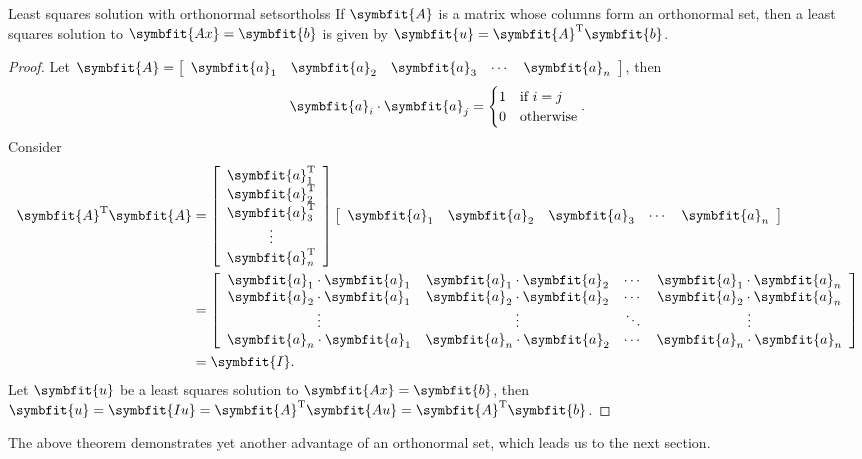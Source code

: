\documentclass[math]{amznotes}
\theoremstyle{remark}
\begin{document}
\begin{thmbox}{Least squares solution with orthonormal sets}{ortholss}
    If $\symbfit{A}$ is a matrix whose columns form an orthonormal set, then a least squares solution to $\symbfit{Ax} = \symbfit{b}$ is given by $\symbfit{u} = \symbfit{A}^{\mathrm{T}}\symbfit{b}$.
    \tcblower
    \begin{proof}
        Let $\symbfit{A} = \left[\begin{array}{ccccc}
            \symbfit{a}_1 & \symbfit{a}_2 & \symbfit{a}_3 & \cdots & \symbfit{a}_n
        \end{array}\right]$, then 
        \begin{displaymath}
            \symbfit{a}_i \cdot \symbfit{a}_j = \begin{cases}
                1 & \textrm{if } i = j \\
                0 & \textrm{otherwise}
            \end{cases}.
        \end{displaymath}
        Consider
        \begin{align*}
            \symbfit{A}^{\mathrm{T}}\symbfit{A} & = \left[\begin{array}{c}
                \symbfit{a}_1 ^{\mathrm{T}} \\
                \symbfit{a}_2 ^{\mathrm{T}}\\
                \symbfit{a}_3 ^{\mathrm{T}}\\
                \vdots \\
                \symbfit{a}_n ^{\mathrm{T}}
            \end{array}\right] \left[\begin{array}{ccccc}
                \symbfit{a}_1 & \symbfit{a}_2 & \symbfit{a}_3 & \cdots & \symbfit{a}_n
            \end{array}\right] \\
            & = \left[\begin{array}{cccc}
                \symbfit{a}_1 \cdot \symbfit{a}_1 & \symbfit{a}_1 \cdot \symbfit{a}_2 & \cdots & \symbfit{a}_1 \cdot \symbfit{a}_n \\
                \symbfit{a}_2 \cdot \symbfit{a}_1 & \symbfit{a}_2 \cdot \symbfit{a}_2 & \cdots & \symbfit{a}_2 \cdot \symbfit{a}_n \\
                \vdots & \vdots & \ddots & \vdots \\
                \symbfit{a}_n \cdot \symbfit{a}_1 & \symbfit{a}_n \cdot \symbfit{a}_2 & \cdots & \symbfit{a}_n \cdot \symbfit{a}_n \\
            \end{array}\right] \\
            & = \symbfit{I}.
        \end{align*}
        Let $\symbfit{u}$ be a least squares solution to $\symbfit{Ax} = \symbfit{b}$, then $\symbfit{u} = \symbfit{Iu} = \symbfit{A}^{\mathrm{T}}\symbfit{Au} = \symbfit{A}^{\mathrm{T}}\symbfit{b}$.
    \end{proof}
\end{thmbox}
The above theorem demonstrates yet another advantage of an orthonormal set, which leads us to the next section.
\end{document}

